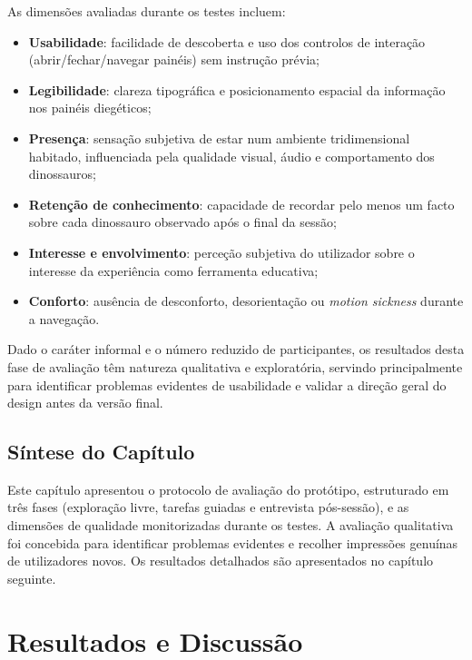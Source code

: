 \documentclass[a4paper,11pt]{report}
\newcommand{\blankpage}{%
    \newpage
    \thispagestyle{empty}
    \mbox{}
    \newpage
}
\begin{document}
As dimensões avaliadas durante os testes incluem:

\begin{itemize}
    \setlength\itemsep{0pt}
    \item \textbf{Usabilidade}: facilidade de descoberta e uso dos controlos
          de interação (abrir/fechar/navegar painéis) sem instrução prévia;
    \item \textbf{Legibilidade}: clareza tipográfica e posicionamento espacial
          da informação nos painéis diegéticos;
    \item \textbf{Presença}: sensação subjetiva de estar num ambiente
          tridimensional habitado, influenciada pela qualidade visual, áudio
          e comportamento dos dinossauros;
    \item \textbf{Retenção de conhecimento}: capacidade de recordar pelo menos
          um facto sobre cada dinossauro observado após o final da sessão;
    \item \textbf{Interesse e envolvimento}: perceção subjetiva do utilizador
          sobre o interesse da experiência como ferramenta educativa;
    \item \textbf{Conforto}: ausência de desconforto, desorientação ou
          \textit{motion sickness} durante a navegação.
\end{itemize}

Dado o caráter informal e o número reduzido de participantes, os resultados
desta fase de avaliação têm natureza qualitativa e exploratória, servindo
principalmente para identificar problemas evidentes de usabilidade e validar
a direção geral do design antes da versão final.

\section{Síntese do Capítulo}

Este capítulo apresentou o protocolo de avaliação do protótipo, estruturado
em três fases (exploração livre, tarefas guiadas e entrevista pós-sessão),
e as dimensões de qualidade monitorizadas durante os testes. A avaliação
qualitativa foi concebida para identificar problemas evidentes e recolher
impressões genuínas de utilizadores novos. Os resultados detalhados são
apresentados no capítulo seguinte.

\blankpage

\chapter{Resultados e Discussão}
\end{document}
